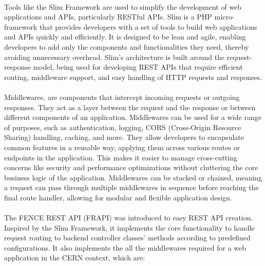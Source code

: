 \paragraph{} Tools like the Slim Framework are used to simplify the development of web applications and APIs, particularly RESTful APIs. Slim is a PHP micro-framework that provides developers with a set of tools to build web applications and APIs quickly and efficiently. It is designed to be lean and agile, enabling developers to add only the components and functionalities they need, thereby avoiding unnecessary overhead. Slim's architecture is built around the request-response model, being used for developing REST APIs that require efficient routing, middleware support, and easy handling of HTTP requests and responses. 

\paragraph{} Middlewares, are components that intercept incoming requests or outgoing responses. They act as a layer between the request and the response or between different components of an application. Middlewares can be used for a wide range of purposes, such as authentication, logging, CORS (Cross-Origin Resource Sharing) handling, caching, and more. They allow developers to encapsulate common features in a reusable way, applying them across various routes or endpoints in the application. This makes it easier to manage cross-cutting concerns like security and performance optimizations without cluttering the core business logic of the application. Middlewares can be stacked or chained, meaning a request can pass through multiple middlewares in sequence before reaching the final route handler, allowing for modular and flexible application design.

\paragraph{} The FENCE REST API (FRAPI) was introduced to easy REST API creation. Inspired by the Slim Framework, it implements the core functionality to handle request routing to backend controller classes' methods according to predefined configurations. It also implements the all the middlewares required for a web application in the CERN context, which are: 


